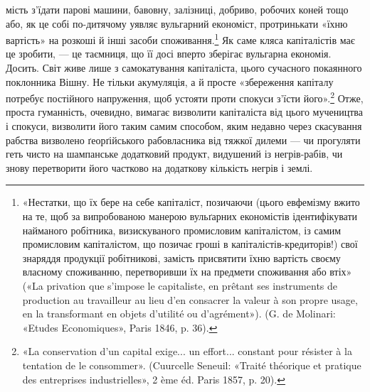 мість з’їдати парові машини, бавовну, залізниці, добриво, робочих
коней тощо або, як це собі по-дитячому уявляє вульгарний
економіст, протринькати «їхню вартість» на розкоші
й інші засоби споживання.\footnote{
«Нестатки, що їх бере на себе капіталіст, позичаючи (цього
евфемізму вжито на те, щоб за випробованою манерою вульґарних економістів
ідентифікувати найманого робітника, визискуваного промисловим
капіталістом, із самим промисловим капіталістом, що позичає гроші
в капіталістів-кредиторів!) свої знаряддя продукції робітникові, замість
присвятити їхню вартість своєму власному споживанню, перетворивши
їх на предмети споживання або втіх» («La privation que s’impose le
capitaliste, en prêtant ses instruments de production au travailleur au lieu
d’en consacrer la valeur à son propre usage, en la transformant en objets
d'utilité ou d’agrément»). (G. de Molinari: «Etudes Economiques», Paris
1846, p. 36).
} Як саме кляса капіталістів має
це зробити, — це таємниця, що її досі вперто зберігає вульгарна
економія. Досить. Світ живе лише з самокатування капіталіста,
цього сучасного покаянного поклонника Вішну. Не тільки
акумуляція, а й просте «збереження капіталу потребує постійного
напруження, щоб устояти проти спокуси з’їсти його».\footnote{
«La conservation d’un capital exige... un effort... constant pour
résister à la tentation de le consommer». (Cuurcelle Seneuil: «Traité théorique
et pratique des entreprises industrielles», 2 ème éd. Paris 1857, p. 20).
}
Отже, проста гуманність, очевидно, вимагає визволити капіталіста
від цього мучеництва і спокуси, визволити його таким самим
способом, яким недавно через скасування рабства визволено
ґеорґійського рабовласника від тяжкої дилеми — чи прогуляти
геть чисто на шампанське додатковий продукт, видушений із
негрів-рабів, чи знову перетворити його частково на додаткову
кількість негрів і землі.

